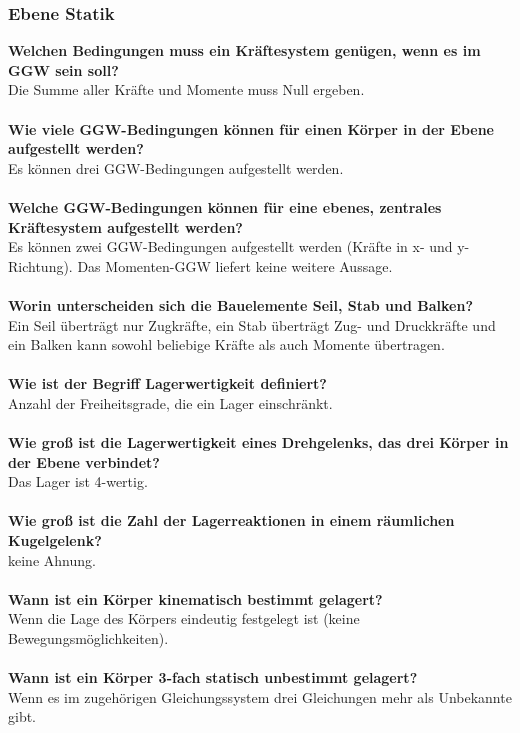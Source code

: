 \documentclass[a4paper,twocolumn,10pt]{article}
\begin{document}
\subsubsection{Ebene Statik}
\textbf{Welchen Bedingungen muss ein Kräftesystem genügen, wenn es im GGW sein soll?}\\
Die Summe aller Kräfte und Momente muss Null ergeben.\\\\
\textbf{Wie viele GGW-Bedingungen können für einen Körper in der Ebene aufgestellt werden?}\\
Es können drei GGW-Bedingungen aufgestellt werden.\\\\
\textbf{Welche GGW-Bedingungen können für eine ebenes, zentrales Kräftesystem aufgestellt werden?}\\
Es können zwei GGW-Bedingungen aufgestellt werden (Kräfte in x- und y-Richtung). Das Momenten-GGW liefert keine weitere Aussage.\\\\
\textbf{Worin unterscheiden sich die Bauelemente Seil, Stab und Balken?}\\
Ein Seil überträgt nur Zugkräfte, ein Stab überträgt Zug- und Druckkräfte und ein Balken kann sowohl beliebige Kräfte als auch Momente übertragen.\\\\
\textbf{Wie ist der Begriff Lagerwertigkeit definiert?}\\
Anzahl der Freiheitsgrade, die ein Lager einschränkt.\\\\
\textbf{Wie groß ist die Lagerwertigkeit eines Drehgelenks, das drei Körper in der Ebene verbindet?}\\
Das Lager ist 4-wertig.\\\\
\textbf{Wie groß ist die Zahl der Lagerreaktionen in einem räumlichen Kugelgelenk?}\\
{\color{red}keine Ahnung.}\\\\
\textbf{Wann ist ein Körper kinematisch bestimmt gelagert?}\\
Wenn die Lage des Körpers eindeutig festgelegt ist (keine Bewegungsmöglichkeiten).\\\\
\textbf{Wann ist ein Körper 3-fach statisch unbestimmt gelagert?}\\
Wenn es im zugehörigen Gleichungssystem drei Gleichungen mehr als Unbekannte gibt.
\end{document}
